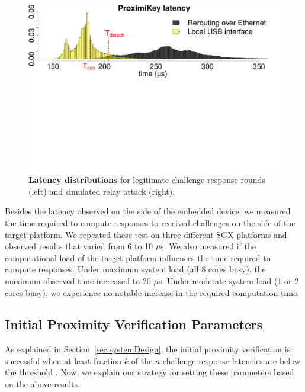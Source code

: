 \begin{figure}[t]
  \centering
    \includegraphics[trim={0 13.4cm 0 0},
    clip,width=\linewidth]{chapters/ProximiTEE/figures/histo.pdf} 
    \caption[Latency distributions]{\textbf{Latency distributions} for legitimate challenge-response rounds (left) and simulated relay attack (right).}
    \label{graph:instatAttackerHisto}
\end{figure}



Besides the latency observed on the side of the embedded device, we measured the time required to compute responses to received challenges on the side of the target platform. We repeated these test on three different SGX platforms and observed results that varied from 6 to 10 $\mu$s. We also measured if the computational load of the target platform influences the time required to compute responses. Under maximum system load (all 8 cores busy), the maximum observed time increased to 20 $\mu$s. Under moderate system load (1 or 2 cores busy), we experience no notable increase in the required computation time. 


\subsection{Initial Proximity Verification Parameters}
\label{sec:evaluation:parameters}

As explained in Section~\ref{sec:systemDesign}, the initial proximity verification is successful when at least fraction $k$ of the $n$ challenge-response latencies are below the threshold \connect.  Now, we explain our strategy for setting these parameters based on the above results.

